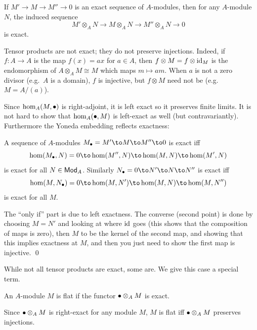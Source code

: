 \bprop

    If $M'\to M\to M''\to0$ is an exact sequence of $A$-modules, then for any $A$-module $N$, the induced sequence
    $$ M'\otimes_AN \to M\otimes_AN \to M''\otimes_AN \to 0 $$
    is exact.

\eprop

\bnote

    Tensor products are not exact; they do not preserve injections.
    Indeed, if $f\colon A\to A$ is the map $f(x)=ax$ for $a\in A$, then $f\otimes M=f\otimes{\rm id}_M$ is the endomorphism of
    $A\otimes_AM\cong M$ which maps $m\mapsto am$.
    When $a$ is not a zero divisor (e.g.\ $A$ is a domain), $f$ is injective, but $f\otimes M$ need not be (e.g.\ $M=A/(a)$).

\enote

Since $\hom_A(M,\bullet)$ is right-adjoint, it is left exact so it preserves finite limits.
It is not hard to show that $\hom_A(\bullet,M)$ is left-exact as well (but contravariantly).
Furthermore the Yoneda embedding reflects exactness:

\bprop

    A sequence of $A$-modules $M_\bul=M'\to M\to M''\to0$ is exact iff
    $$ \hom(M_\bul,N) = 0 \to \hom(M'',N) \to \hom(M,N) \to \hom(M',N) $$
    is exact for all $N\in{\sf Mod}_A$.
    Similarly $N_\bul=0\to N'\to N\to N''$ is exact iff
    $$ \hom(M,N_\bul) = 0 \to \hom(M,N') \to \hom(M,N) \to \hom(M,N'') $$
    is exact for all $M$.

\eprop

\bproof

    The ``only if'' part is due to left exactness.
    The converse (second point) is done by choosing $M=N'$ and looking at where ${\rm id}$ goes (this shows that the composition of maps
    is zero), then $M$ to be the kernel of the second map, and showing that this implies exactness at $M$, and then you just need to
    show the first map is injective.
    \qed

\eproof

While not all tensor products are exact, some are.
We give this case a special term.

\bdefn

    An $A$-module $M$ is {\emphcolor flat} if the functor $\bullet\otimes_AM$ is exact.

\edefn

\bnote

    Since $\bullet\otimes_AM$ is right-exact for any module $M$, $M$ is flat iff $\bullet\otimes_AM$ preserves injections.

